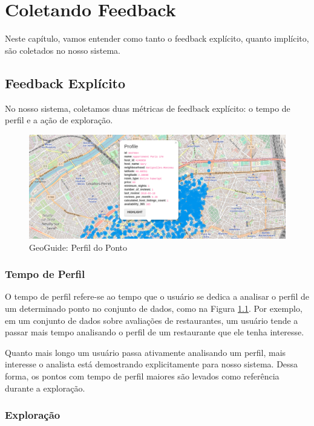 \chapter{Coletando Feedback}
\label{chap:coletando}

Neste capítulo, vamos entender como tanto o feedback explícito, quanto implícito, são coletados no nosso sistema.

\section{Feedback Explícito}

No nosso sistema, coletamos duas métricas de feedback explícito: o tempo de perfil e a ação de exploração.

\begin{figure}[t]
	\centering
	\includegraphics[width=\columnwidth]{imagens/perfil-do-ponto}
	\caption{GeoGuide: Perfil do Ponto}
	\label{fig:perfil-do-ponto}
	\vspace{-10pt}
\end{figure}

\subsection{Tempo de Perfil}

O tempo de perfil refere-se ao tempo que o usuário se dedica a analisar o perfil de um determinado ponto no conjunto de dados, como na Figura \ref{fig:perfil-do-ponto}. Por exemplo, em um conjunto de dados sobre avaliações de restaurantes, um usuário tende a passar mais tempo analisando o perfil de um restaurante que ele tenha interesse.

Quanto mais longo um usuário passa ativamente analisando um perfil, mais interesse o analista está demostrando explicitamente para nosso sistema. Dessa forma, os pontos com tempo de perfil maiores são levados como referência durante a exploração.

\subsection{Exploração}

